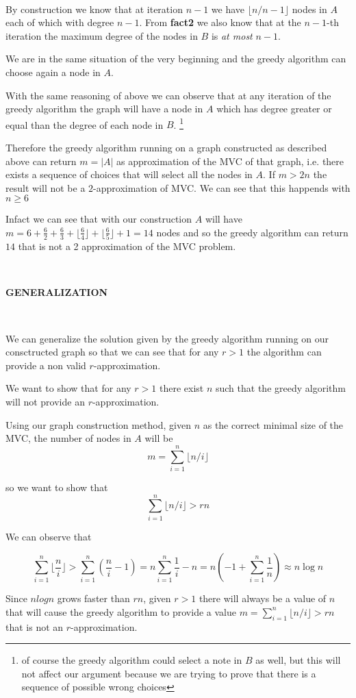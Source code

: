 \documentclass[a4paper]{article}
\begin{document}
\

By construction we know that at iteration $n-1$ we have $\lfloor n/n-1 \rfloor$ nodes in $A$ each of which with degree $n-1$.
From \textbf{fact2} we also know that at the $n-1$-th iteration the maximum degree of the nodes in $B$  is \emph{at most} $n-1$.

\noindent
We are in the same situation of the very beginning and the greedy algorithm can choose again a node in $A$.

With the same reasoning of above we can observe that at any iteration of the greedy algorithm the graph will have a node in $A$ which has degree greater or equal than the degree of each node in $B$. \footnote{of course the greedy algorithm could select a note in $B$ as well, but this will not affect our argument because we are trying to prove that there is a sequence of possible wrong choices}

Therefore the greedy algorithm running on a graph constructed as described above can return $m = |A|$ as approximation of the MVC of that graph, i.e. there exists a sequence of choices that will select all the nodes in $A$. 
If $m > 2n$ the result will not be a $2$-approximation of MVC.
We can see that this happends with $n \geq 6$

Infact we can see that with our construction $A$ will have $m = 6 + \frac{6}{2} + \frac{6}{3} + \lfloor \frac{6}{4} \rfloor +   \lfloor \frac{6}{5} \rfloor + 1 = 14$ nodes and so the greedy algorithm can return $14$ that is not a 2 approximation of the MVC problem.

\
\

\textbf{GENERALIZATION}

\
\

We can generalize the solution given by the greedy algorithm running on our consctructed graph so that we can see that for any $r > 1$ the algorithm can provide a non valid $r$-approximation.

We want to show that for any $r>1$ there exist $n$ such that the greedy algorithm will not provide an $r$-approximation.
 
Using our graph construction method, given $n$ as the correct minimal size of the MVC, the number of nodes in $A$ will be 
\[
m = \sum_{i=1}^n \lfloor n/i \rfloor
\]

so we want to show that 
\[
\sum_{i=1}^n \lfloor n/i \rfloor > rn
\]


We can observe that 

\[
\sum_{i=1}^n \lfloor \frac{n}{i} \rfloor > \sum_{i=1}^n (\frac{n}{i} - 1) = n \sum_{i=1}^n \frac{1}{i} - n = n(-1 + \sum_{i=1}^n \frac{1}{n}) \approx n \log{n} 
\]

Since $nlogn$ grows faster than $rn$, given $r>1$ there will always be a value of $n$ that will cause the greedy algorithm to provide a value $m = \sum_{i=1}^n \lfloor n/i \rfloor > rn$ that is not an $r$-approximation.
\end{document}
